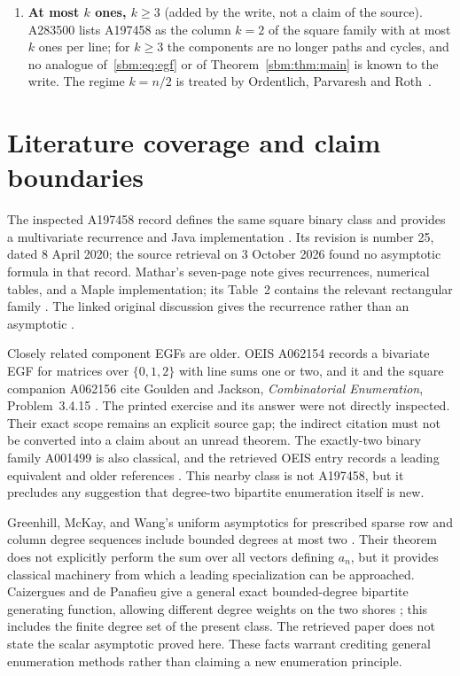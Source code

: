 \documentclass[11pt,letterpaper]{article}
\numberwithin{equation}{section}
\theoremstyle{remark}\newtheorem{remark}[theorem]{Remark}
\begin{document}
\begin{enumerate}
 Section~\ref{sbm:sec:literature}). Open: the exact scope of Goulden and
 Jackson's Problem~3.4.15, Knuth's solution and a specialization of
 Greenhill, McKay and Wang to the sum over degree vectors; by
 Remark~\ref{sbm:rem:oeis} the generating function itself follows from a
 formula of OEIS A062154. The source's bounded search did not find the
 scalar expansion in print; the write made no further search.
\item\label{sbm:q:k} \textbf{At most $k$ ones, $k\ge3$} (added by the write,
 not a claim of the source). A283500 lists A197458 as the column $k=2$ of the
 square family with at most $k$ ones per line; for $k\ge3$ the components are
 no longer paths and cycles, and no analogue of~\eqref{sbm:eq:egf} or of
 Theorem~\ref{sbm:thm:main} is known to the write. The regime $k=n/2$ is
 treated by Ordentlich, Parvaresh and Roth~\cite{opr}.
\end{enumerate}

\section{Literature coverage and claim boundaries}\label{sbm:sec:literature}
The inspected A197458 record defines the same square binary class and
provides a multivariate recurrence and Java implementation
\cite{oeis}. Its revision is number 25, dated 8 April 2020; the
source retrieval on 3 October 2026 found no asymptotic formula in that
record. Mathar's seven-page note gives recurrences, numerical tables,
and a Maple implementation; its Table~2 contains the relevant
rectangular family \cite{mathar}. The linked original discussion gives
the recurrence rather than an asymptotic \cite{mse}.

Closely related component EGFs are older. OEIS A062154 records a
bivariate EGF for matrices over $\{0,1,2\}$ with line sums one or two,
and it and the square companion A062156 cite Goulden and Jackson,
\emph{Combinatorial Enumeration}, Problem~3.4.15 \cite{companion}.
The printed exercise and its answer were not directly inspected.
Their exact scope remains an explicit source gap; the indirect
citation must not be converted into a claim about an unread theorem.
The exactly-two binary family A001499 is also classical, and the
retrieved OEIS entry records a leading equivalent and older
references \cite{regular}. This nearby class is not A197458, but it
precludes any suggestion that degree-two bipartite enumeration itself
is new.

Greenhill, McKay, and Wang's uniform asymptotics for prescribed sparse
row and column degree sequences include bounded degrees at most two
\cite{gmw}. Their theorem does not explicitly perform the sum over all
vectors defining $a_n$, but it provides classical machinery from
which a leading specialization can be approached. Caizergues and
de Panafieu give a general exact bounded-degree bipartite generating
function, allowing different degree weights on the two shores
\cite{cp}; this includes the finite degree set of the present class.
The retrieved paper does not state the scalar asymptotic proved here.
These facts warrant crediting general enumeration methods rather than
claiming a new enumeration principle.
\end{document}
